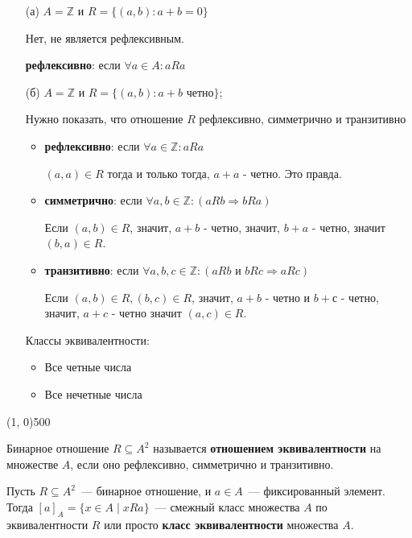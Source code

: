 \documentclass{article}
\begin{document}
\begin{itemize}
\item[(а)]
$A = \mathbb{Z}$ и $R = \{(a, b) \colon a + b = 0\}$

Нет, не является рефлексивным.

\textbf{рефлексивно}: если $\forall a \in A: aRa$ 

\item[(б)]
$A = \mathbb{Z}$ и $R = \{(a, b) \colon a + b \,\,\text{четно}\}$;

Нужно показать, что отношение $R$ рефлексивно, симметрично и транзитивно

\begin{itemize}
		\item \textbf{рефлексивно}: если $\forall a \in \mathbb{Z}: aRa$ 
		
		$(a, a) \in R$ тогда и только тогда, $a + a$ - четно. Это правда.
		
		\item \textbf{симметрично}: если $\forall a, b \in \mathbb{Z}: (aRb \Longrightarrow bRa)$
		
		 Если $(a, b) \in R$, значит, $a + b$ - четно, значит, $b + a$ - четно, значит $(b, a) \in R$.
		
		\item \textbf{транзитивно}: если $\forall a, b, c \in \mathbb{Z}: (aRb \text{ и } bRc \Longrightarrow aRc)$
		
		Если $(a, b) \in R, (b, c) \in R$, значит, $a + b$ - четно и $b + с$ - четно, значит, $a + c$ - четно значит $(a, c) \in R$.
		
		\end{itemize}


Классы эквивалентности: 

\begin{itemize}
\item Все четные числа 
\item Все нечетные числа
\end{itemize}

\end{itemize}




\line(1, 0){500}

Бинарное отношение $R \subseteq A^2$ называется \textbf{отношением эквивалентности} на множестве $A$, если оно рефлексивно, симметрично и транзитивно.

Пусть $R \subseteq A^2$~--- бинарное отношение, и $a \in A$~--- фиксированный элемент. Тогда $[a]_A = \{x \in A \mid xRa \}$~--- смежный класс множества $A$ по эквивалентности $R$ или просто \textbf{класс эквивалентности} множества $A$.
\end{document}
